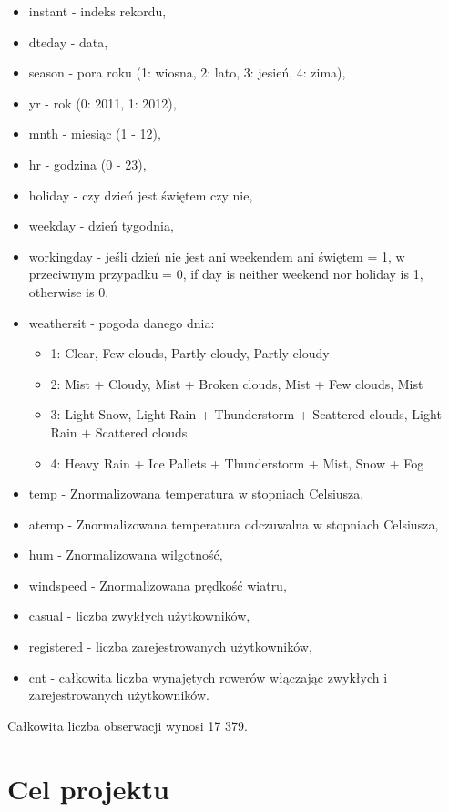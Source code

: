 \documentclass[12pt]{article}
\begin{document}
\begin{itemize}

\item instant - indeks rekordu,
\item dteday - data,
\item season - pora roku (1: wiosna, 2: lato, 3: jesień, 4: zima),
\item yr - rok (0: 2011, 1: 2012),
\item mnth - miesiąc (1 - 12),
\item hr - godzina (0 - 23),
\item holiday - czy dzień jest świętem czy nie,
\item weekday - dzień tygodnia,
\item workingday - jeśli dzień nie jest ani weekendem ani świętem = 1, w przeciwnym przypadku = 0, if day is neither weekend nor holiday is 1, otherwise is 0.
\item  weathersit - pogoda danego dnia: 
\begin{itemize}
	\item 1: Clear, Few clouds, Partly cloudy, Partly cloudy
	\item 2: Mist + Cloudy, Mist + Broken clouds, Mist + Few clouds, Mist
	\item 3: Light Snow, Light Rain + Thunderstorm + Scattered clouds, Light Rain + Scattered clouds
	\item 4: Heavy Rain + Ice Pallets + Thunderstorm + Mist, Snow + Fog
\end{itemize}
\item temp - Znormalizowana temperatura w stopniach Celsiusza, 
\item atemp - Znormalizowana temperatura odczuwalna w stopniach Celsiusza,
\item hum - Znormalizowana wilgotność,
\item windspeed - Znormalizowana prędkość wiatru,
\item casual - liczba zwykłych użytkowników,
\item registered - liczba zarejestrowanych użytkowników,
\item cnt - całkowita liczba wynajętych rowerów włączając zwykłych i zarejestrowanych użytkowników.

\end{itemize}

Całkowita liczba obserwacji wynosi 17 379.

\section{Cel projektu}
\end{document}
